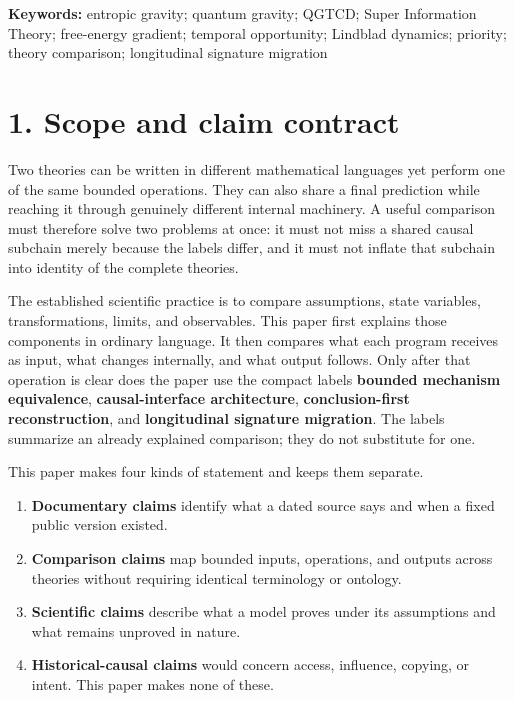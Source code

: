 \documentclass[
  american,
  11pt,
  letterpaper,
]{article}
\newcounter{none} %
\providecommand{\tightlist}{%
  \setlength{\itemsep}{0pt}\setlength{\parskip}{0pt}}
\begin{document}
\noindent\textbf{Keywords:} entropic gravity; quantum gravity; QGTCD; Super Information Theory; free-energy gradient; temporal opportunity; Lindblad dynamics; priority; theory comparison; longitudinal signature migration

\section{1. Scope and claim contract}\label{scope-and-claim-contract}

Two theories can be written in different mathematical languages yet perform one of the same bounded operations. They can also share a final prediction while reaching it through genuinely different internal machinery. A useful comparison must therefore solve two problems at once: it must not miss a shared causal subchain merely because the labels differ, and it must not inflate that subchain into identity of the complete theories.

The established scientific practice is to compare assumptions, state variables, transformations, limits, and observables. This paper first explains those components in ordinary language. It then compares what each program receives as input, what changes internally, and what output follows. Only after that operation is clear does the paper use the compact labels \textbf{bounded mechanism equivalence}, \textbf{causal-interface architecture}, \textbf{conclusion-first reconstruction}, and \textbf{longitudinal signature migration}. The labels summarize an already explained comparison; they do not substitute for one.

This paper makes four kinds of statement and keeps them separate.

\begin{enumerate}
\def\labelenumi{\arabic{enumi}.}
\tightlist
\item
  \textbf{Documentary claims} identify what a dated source says and when a fixed public version existed.
\item
  \textbf{Comparison claims} map bounded inputs, operations, and outputs across theories without requiring identical terminology or ontology.
\item
  \textbf{Scientific claims} describe what a model proves under its assumptions and what remains unproved in nature.
\item
  \textbf{Historical-causal claims} would concern access, influence, copying, or intent. This paper makes none of these.
\end{enumerate}
\end{document}
